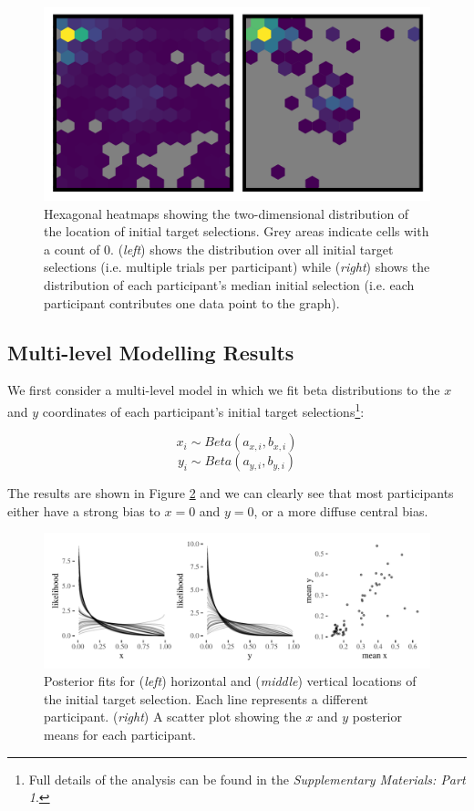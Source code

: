 \documentclass[preprints, article,submit,pdftex,moreauthors]{Definitions/mdpi}
\begin{document}
\begin{figure}[H]
\centering
\includegraphics[width=12 cm]{Figures/init_sel_hex_plot.pdf}
\caption{Hexagonal heatmaps showing the two-dimensional distribution of the location of initial target selections. Grey areas indicate cells with a count of 0. (\textit{left}) shows the distribution over all initial target selections (i.e. multiple trials per participant) while (\textit{right}) shows the distribution of each participant's median initial selection (i.e. each participant contributes one data point to the graph). }
\label{fig:qjep_init_sel_hex}
\end{figure} 

\subsection{Multi-level Modelling Results}

We first consider a multi-level model in which we fit beta distributions to the $x$ and $y$ coordinates of each participant's initial target selections\footnote{Full details of the analysis can be found in the \textit{Supplementary Materials: Part 1}.}:

\begin{equation}
    x_i \sim Beta(a_{x,i}, b_{x,i})
    \label{eq:beta1x}
\end{equation}
\begin{equation}
    y_i \sim Beta(a_{y,i}, b_{y,i})
    \label{eq:beta1y}
\end{equation}

The results are shown in Figure \ref{fig:qjep_init_sel_mdl} and we can clearly see that most participants either have a strong bias to $x=0$ and $y=0$, or a more diffuse central bias. 

\begin{figure}[H]
\centering
\includegraphics[width=12 cm]{Figures/init_sel_mdl.pdf}
\caption{Posterior fits for (\textit{left}) horizontal and (\textit{middle}) vertical locations of the initial target selection. Each line represents a different participant. (\textit{right}) A scatter plot showing the $x$ and $y$ posterior means for each participant.}
\label{fig:qjep_init_sel_mdl}
\end{figure} 
\end{document}
